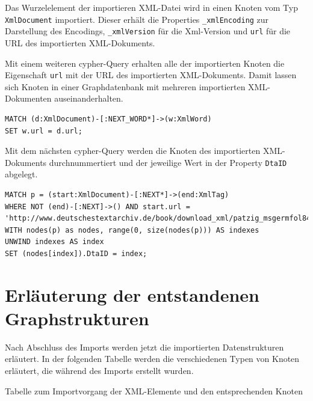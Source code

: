 \documentclass[ngerman,]{scrreprt}
\begin{document}
Das Wurzelelement der importieren XML-Datei wird in einen Knoten vom Typ \texttt{XmlDocument} importiert. Dieser erhält die Properties \texttt{\_xmlEncoding} zur Darstellung des Encodings, \texttt{\_xmlVersion} für die Xml-Version und \texttt{url} für die URL des importierten XML-Dokuments.

Mit einem weiteren cypher-Query erhalten alle der importierten Knoten die Eigenschaft \texttt{url} mit der URL des importierten XML-Dokuments. Damit lassen sich Knoten in einer Graphdatenbank mit mehreren importierten XML-Dokumenten auseinanderhalten.

\begin{verbatim}
MATCH (d:XmlDocument)-[:NEXT_WORD*]->(w:XmlWord)
SET w.url = d.url;
\end{verbatim}

Mit dem nächsten cypher-Query werden die Knoten des importierten XML-Dokuments durchnummertiert und der jeweilige Wert in der Property \texttt{DtaID} abgelegt.

\begin{verbatim}
MATCH p = (start:XmlDocument)-[:NEXT*]->(end:XmlTag)
WHERE NOT (end)-[:NEXT]->() AND start.url = 'http://www.deutschestextarchiv.de/book/download_xml/patzig_msgermfol841842_1828'
WITH nodes(p) as nodes, range(0, size(nodes(p))) AS indexes
UNWIND indexes AS index
SET (nodes[index]).DtaID = index;
\end{verbatim}

\section{Erläuterung der entstandenen Graphstrukturen}\label{erluxe4uterung-der-entstandenen-graphstrukturen}

Nach Abschluss des Imports werden jetzt die importierten Datenstrukturen erläutert. In der folgenden Tabelle werden die verschiedenen Typen von Knoten erläutert, die während des Imports erstellt wurden.

Tabelle zum Importvorgang der XML-Elemente und den entsprechenden Knoten
\end{document}
